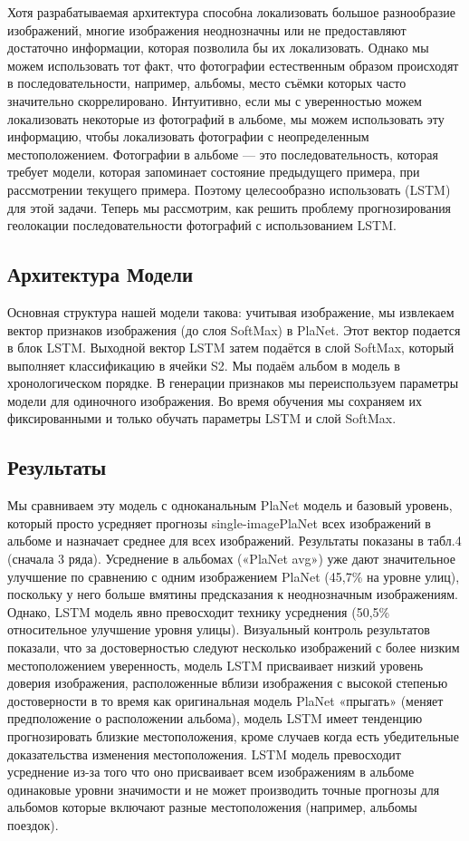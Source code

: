 Хотя разрабатываемая архитектура способна локализовать большое разнообразие изображений, многие изображения неоднозначны или не предоставляют достаточно информации, которая позволила бы их локализовать.
Однако мы можем использовать тот факт, что фотографии естественным образом происходят в последовательности, например, альбомы, место съёмки которых часто значительно скоррелировано. Интуитивно, если мы с уверенностью можем локализовать
некоторые из фотографий в альбоме, мы можем использовать эту информацию,
чтобы локализовать фотографии с неопределенным местоположением. Фотографии в альбоме --- это последовательность,
которая требует модели, которая запоминает состояние предыдущего примера, 
при рассмотрении текущего примера. Поэтому целесообразно использовать
(LSTM) \cite{hochreiter1997long} для этой задачи.
Теперь мы рассмотрим, как решить проблему прогнозирования
геолокации последовательности фотографий с использованием LSTM.

\subsection{Архитектура Модели}
Основная структура нашей модели такова:
учитывая изображение, мы извлекаем вектор признаков изображения (до слоя SoftMax) в PlaNet. Этот вектор подается в блок LSTM. Выходной вектор LSTM затем подаётся в слой SoftMax, который
выполняет классификацию в ячейки S2. Мы подаём альбом в модель в хронологическом порядке. В генерации признаков мы переиспользуем параметры модели для одиночного изображения. Во время обучения мы сохраняем их фиксированными и только обучать параметры LSTM и слой SoftMax.
\subsection{Результаты} Мы сравниваем эту модель с одноканальным PlaNet
модель и базовый уровень, который просто усредняет прогнозы single-imagePlaNet всех изображений в альбоме и назначает
среднее для всех изображений. Результаты показаны в табл.4 (сначала
3 ряда). Усреднение в альбомах («PlaNet avg») уже
дают значительное улучшение по сравнению с одним изображением PlaNet
(45,7\% на уровне улиц), поскольку у него больше
вмятины предсказания к неоднозначным изображениям. Однако, LSTM
модель явно превосходит технику усреднения (50,5\%
относительное улучшение уровня улицы). Визуальный контроль
результатов показали, что за достоверностью следуют несколько изображений с более низким местоположением уверенность, модель LSTM присваивает низкий уровень доверия изображения, расположенные вблизи изображения с высокой степенью достоверности в то время как оригинальная модель PlaNet «прыгать» (меняет предположение о расположении альбома), модель LSTM имеет тенденцию прогнозировать близкие местоположения, кроме случаев когда
есть убедительные доказательства изменения местоположения. LSTM
модель превосходит усреднение из-за того что оно присваивает всем изображениям в альбоме одинаковые уровни значимости и не может производить точные прогнозы для альбомов которые включают разные местоположения (например, альбомы поездок).

